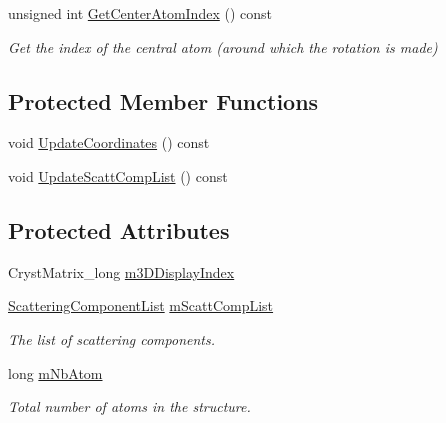 \begin{DoxyCompactItemize}
\mbox{\label{class_obj_cryst_1_1_z_scatterer_ab91b3e04ee26c8574ec35808a8d7b8fe}} 
unsigned int \mbox{\hyperlink{class_obj_cryst_1_1_z_scatterer_ab91b3e04ee26c8574ec35808a8d7b8fe}{Get\+Center\+Atom\+Index}} () const
\begin{DoxyCompactList}\small\item\em Get the index of the central atom (around which the rotation is made) \end{DoxyCompactList}\end{DoxyCompactItemize}
\subsection*{Protected Member Functions}
\begin{DoxyCompactItemize}
\item 
void \mbox{\hyperlink{class_obj_cryst_1_1_z_scatterer_ab6afaab6104211bbca7722033e17a128}{Update\+Coordinates}} () const
\item 
void \mbox{\hyperlink{class_obj_cryst_1_1_z_scatterer_acec423f3f42ba0b1c173d8bc9fe96279}{Update\+Scatt\+Comp\+List}} () const
\end{DoxyCompactItemize}
\subsection*{Protected Attributes}
\begin{DoxyCompactItemize}
\item 
Cryst\+Matrix\+\_\+long \mbox{\hyperlink{class_obj_cryst_1_1_z_scatterer_aa02e92087f85784a74d1bdcebf178da9}{m3\+D\+Display\+Index}}
\item 
\mbox{\label{class_obj_cryst_1_1_z_scatterer_aa7f8346399e0039aa37a13ec9ff3a408}} 
\mbox{\hyperlink{class_obj_cryst_1_1_scattering_component_list}{Scattering\+Component\+List}} \mbox{\hyperlink{class_obj_cryst_1_1_z_scatterer_aa7f8346399e0039aa37a13ec9ff3a408}{m\+Scatt\+Comp\+List}}
\begin{DoxyCompactList}\small\item\em The list of scattering components. \end{DoxyCompactList}\item 
\mbox{\label{class_obj_cryst_1_1_z_scatterer_af4c3961f3b36c0aff6bb644f0831aa01}} 
long \mbox{\hyperlink{class_obj_cryst_1_1_z_scatterer_af4c3961f3b36c0aff6bb644f0831aa01}{m\+Nb\+Atom}}
\begin{DoxyCompactList}\small\item\em Total number of atoms in the structure. \end{DoxyCompactList}\end{DoxyCompactItemize}


